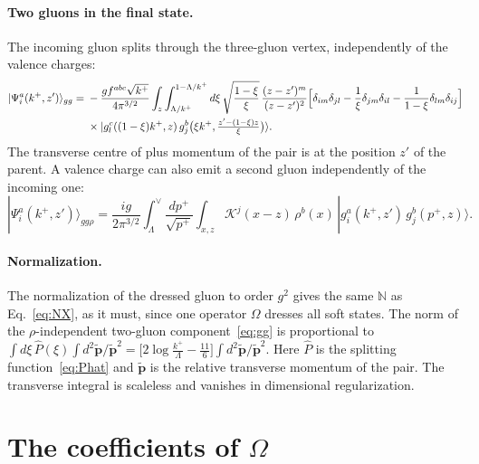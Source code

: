 \documentclass[aps,prd,onecolumn,superscriptaddress,nofootinbib,floatfix,longbibliography,11pt]{revtex4-2}
\numberwithin{equation}{section}
\newcommand{\KK}{\mathcal{K}}
\def\mf#1{\mathbb{#1}}
\newcommand{\Phat}{\hat P}
\begin{document}
\paragraph*{Two gluons in the final state.} The incoming gluon splits through the three-gluon vertex, independently of the valence charges:
\begin{align}
|\Psi^a_i(k^+,z')\rangle_{gg}={}&-\frac{gf^{abc}\sqrt{k^+}}{4\pi^{3/2}}\int_z\int_{\Lambda/k^+}^{1-\Lambda/k^+}d\xi\,\sqrt{\frac{1-\xi}{\xi}}\,\frac{(z-z')^m}{(z-z')^2}\Big[\delta_{im}\delta_{jl}-\frac1\xi\delta_{jm}\delta_{il}-\frac{1}{1-\xi}\delta_{lm}\delta_{ij}\Big]\notag\\
&\times|g^c_l((1-\xi)k^+,z)\,g^b_j\big(\xi k^+,\tfrac{z'-(1-\xi)z}{\xi}\big)\rangle .
\label{eq:gg}
\end{align}
The transverse centre of plus momentum of the pair is at the position $z'$ of the parent. A valence charge can also emit a second gluon independently of the incoming one:
\begin{equation}
|\Psi^a_i(k^+,z')\rangle_{gg\rho}=\frac{ig}{2\pi^{3/2}}\int_{\Lambda}^{\vee}\frac{dp^+}{\sqrt{p^+}}\int_{x,z}\KK^j(x-z)\,\rho^b(x)\,|g^a_i(k^+,z')\,g^b_j(p^+,z)\rangle .
\label{eq:ggrho1}
\end{equation}

\paragraph*{Normalization.} The normalization of the dressed gluon to order $g^2$ gives the same $\mf N$ as Eq.~\eqref{eq:NX}, as it must, since one operator $\Omega$ dresses all soft states. The norm of the $\rho$-independent two-gluon component~\eqref{eq:gg} is proportional to $\int d\xi\,\Phat(\xi)\int d^2\tilde{\mathbf p}/\tilde{\mathbf p}^2=\big[2\log\frac{k^+}{\Lambda}-\frac{11}{6}\big]\int d^2\tilde{\mathbf p}/\tilde{\mathbf p}^2$. Here $\Phat$ is the splitting function~\eqref{eq:Phat} and $\tilde{\mathbf p}$ is the relative transverse momentum of the pair. The transverse integral is scaleless and vanishes in dimensional regularization.
\section{The coefficients of \texorpdfstring{$\Omega$}{Omega}}\label{sec:omega}
\end{document}
